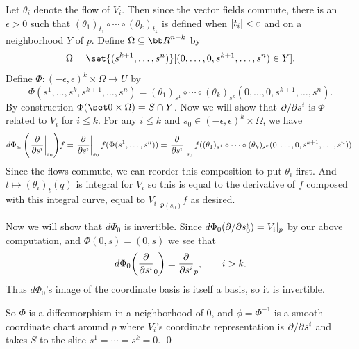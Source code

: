     Let $\theta_i$ denote the flow of $V_i$.
    Then since the vector fields commute, there is an $\epsilon>0$ such that
    $(\theta_1)_{t_1}\circ\cdots\circ(\theta_k)_{t_k}$ is defined when $\mathopen{}\mathclose{\left|t_i\right|}<\varepsilon$ and on a neighborhood $Y$ of $p$.
    Define $\Omega\subseteq\bR^{n-k}$ by
    $$ \Omega = \set{(s^{k+1},\dots,s^n)}[(0,\dots,0,s^{k+1},\dots,s^n)\in Y] . $$
    Define $\Phi\colon(-\epsilon,\epsilon)^k\times\Omega\to U$ by
    $$ \Phi(s^1,\dots,s^k,s^{k+1},\dots,s^n) = (\theta_1)_{s^1}\circ\cdots\circ(\theta_k)_{s^k}(0,\dots,0,s^{k+1},\dots,s^n). $$
    By construction $\Phi(\set 0\times\Omega)=S\cap Y$.
    Now we will show that $\partial /\partial s^i$ is $\Phi$-related to $V_i$ for $i\leq k$.
    For any $i\leq k$ and $s_0\in(-\epsilon,\epsilon)^k\times\Omega$, we have
    $$ d\Phi_{s_0}\mathopen{}\mathclose{\left(\left.{{\partial }\over{\partial s^i}}\right|_{s_0}\right)}f = \left.{{\partial }\over{\partial s^i}}\right|_{s_0}f(\Phi(s^1,\dots,s^n))
    = \left.{{\partial }\over{\partial s^i}}\right|_{s_0}f((\theta_1)_{s^1}\circ\cdots\circ(\theta_k)_{s^k}(0,\dots,0,s^{k+1},\dots,s^n)) . $$
    Since the flows commute, we can reorder this composition to put $\theta_i$ first.
    And $t\mapsto(\theta_i)_t(q)$ is integral for $V_i$ so this is equal to the derivative of $f$ composed with this
    integral curve, equal to $V_i|_{\Phi(s_0)}f$ as desired.

    Now we will show that $d\Phi_0$ is invertible.
    Since $d\Phi_0(\partial /\partial s^i_0)=V_i|_p$ by our above computation, and $\Phi(0,\bar s)=(0,\bar s)$ we see that
    $$ d\Phi_0\mathopen{}\mathclose{\left({{\partial }\over{\partial s^i}}_0\right)} = {{\partial }\over{\partial s^i}}_p,\qquad i>k . $$
    Thus $d\Phi_0$'s image of the coordinate basis is itself a basis, so it is invertible.

    So $\Phi$ is a diffeomorphism in a neighborhood of $0$, and $\phi=\Phi^{-1}$ is a smooth coordinate chart around $p$
    where $V_i$'s coordinate representation is $\partial /\partial s^i$ and takes $S$ to the slice $s^1=\cdots=s^k=0$.
    \qed

\eproof

